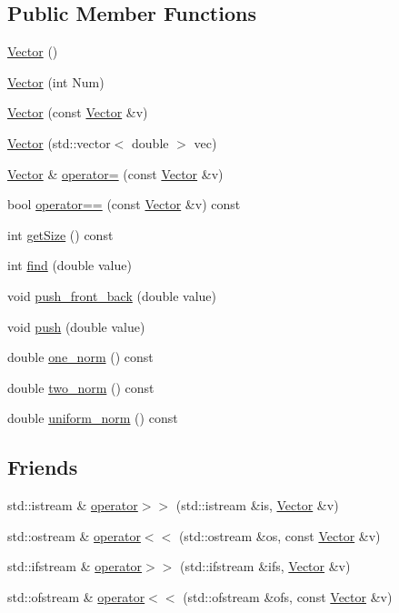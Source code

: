 \subsection*{Public Member Functions}
\begin{DoxyCompactItemize}
\item 
\hyperlink{classVector_a6f80c73b5f18dcf3f8e36065bdc8b9e5}{Vector} ()
\item 
\hyperlink{classVector_acbdf66550f2caa0a64e0b356fb63a277}{Vector} (int Num)
\item 
\hyperlink{classVector_a5f04e343b7306ad11f8a82c89b486764}{Vector} (const \hyperlink{classVector}{Vector} \&v)
\item 
\hyperlink{classVector_aae1353b115bc63a9115a8619659a4179}{Vector} (std\+::vector$<$ double $>$ vec)
\item 
\hyperlink{classVector}{Vector} \& \hyperlink{classVector_ae48c467a9f65d60e2f7455aba4ca1239}{operator=} (const \hyperlink{classVector}{Vector} \&v)
\item 
bool \hyperlink{classVector_afe95adbfc44a173a404039b717df35a5}{operator==} (const \hyperlink{classVector}{Vector} \&v) const 
\item 
int \hyperlink{classVector_ad7a31bddb977b9fee5fd6226d77ca119}{get\+Size} () const 
\item 
int \hyperlink{classVector_aa3039634ae7c98a3d46c351639c9b5ba}{find} (double value)
\item 
void \hyperlink{classVector_a2c5afe0bb139bceda6723c22eb52a1cc}{push\+\_\+front\+\_\+back} (double value)
\item 
void \hyperlink{classVector_a762d62609d78fc2c59fc01774e806b3a}{push} (double value)
\item 
double \hyperlink{classVector_a6d840e97c65aa82bdedd2e09593e6fb5}{one\+\_\+norm} () const 
\item 
double \hyperlink{classVector_a251aae1e7686d923e4dad4679e37e997}{two\+\_\+norm} () const 
\item 
double \hyperlink{classVector_a72726780286e047ea7fdc1bc48bc8d7f}{uniform\+\_\+norm} () const 
\end{DoxyCompactItemize}
\subsection*{Friends}
\begin{DoxyCompactItemize}
\item 
std\+::istream \& \hyperlink{classVector_ac198cff0f4196c66649278458eebf227}{operator$>$$>$} (std\+::istream \&is, \hyperlink{classVector}{Vector} \&v)
\item 
std\+::ostream \& \hyperlink{classVector_ac254b27efeb8486ee2f67821e3a21a60}{operator$<$$<$} (std\+::ostream \&os, const \hyperlink{classVector}{Vector} \&v)
\item 
std\+::ifstream \& \hyperlink{classVector_ab6009b37fac65598b3db164dc4f19fed}{operator$>$$>$} (std\+::ifstream \&ifs, \hyperlink{classVector}{Vector} \&v)
\item 
std\+::ofstream \& \hyperlink{classVector_a8e755f5550c983df730602890058d990}{operator$<$$<$} (std\+::ofstream \&ofs, const \hyperlink{classVector}{Vector} \&v)
\end{DoxyCompactItemize}


